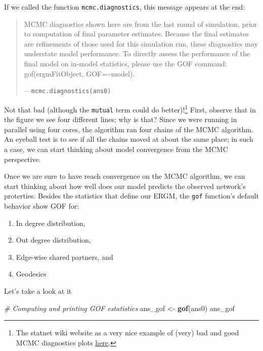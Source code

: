 \documentclass[
]{book}
\newenvironment{Shaded}{\begin{snugshade}}{\end{snugshade}}
\newcommand{\CommentTok}[1]{\textcolor[rgb]{0.56,0.35,0.01}{\textit{#1}}}
\newcommand{\FunctionTok}[1]{\textcolor[rgb]{0.13,0.29,0.53}{\textbf{#1}}}
\newcommand{\NormalTok}[1]{#1}
\newcommand{\OtherTok}[1]{\textcolor[rgb]{0.56,0.35,0.01}{#1}}
\providecommand{\tightlist}{%
  \setlength{\itemsep}{0pt}\setlength{\parskip}{0pt}}
\begin{document}
If we called the function \texttt{mcmc.diagnostics}, this message appears at the end:

\begin{quote}
MCMC diagnostics shown here are from the last round of simulation, prior to computation of final parameter estimates. Because the final estimates are refinements of those used for this simulation run, these diagnostics may understate model performance. To directly assess the performance of the final model on in-model statistics, please use the GOF command: gof(ergmFitObject, GOF=\textasciitilde model).

---\texttt{mcmc.diagnostics(ans0)}
\end{quote}

Not that bad (although the \texttt{mutual} term could do better)!\footnote{The statnet wiki website as a very nice example of (very) bad and good MCMC diagnostics plots \href{https://statnet.org/trac/raw-attachment/wiki/Resources/ergm.fit.diagnostics.pdf}{here}.} First, observe that in the figure we see four different lines; why is that? Since we were running in parallel using four cores, the algorithm ran four chains of the MCMC algorithm. An eyeball test is to see if all the chains moved at about the same place; in such a case, we can start thinking about model convergence from the MCMC perspective.

Once we are sure to have reach convergence on the MCMC algorithm, we can start thinking about how well does our model predicts the observed network's proterties. Besides the statistics that define our ERGM, the \texttt{gof} function's default behavior show GOF for:

\begin{enumerate}
\def\labelenumi{\alph{enumi}.}
\tightlist
\item
  In degree distribution,
\item
  Out degree distribution,
\item
  Edge-wise shared partners, and
\item
  Geodesics
\end{enumerate}

Let's take a look at it

\begin{Shaded}
\begin{Highlighting}[]
\CommentTok{\# Computing and printing GOF estatistics}
\NormalTok{ans\_gof }\OtherTok{\textless{}{-}} \FunctionTok{gof}\NormalTok{(ans0)}
\NormalTok{ans\_gof}
\end{Highlighting}
\end{Shaded}
\end{document}
